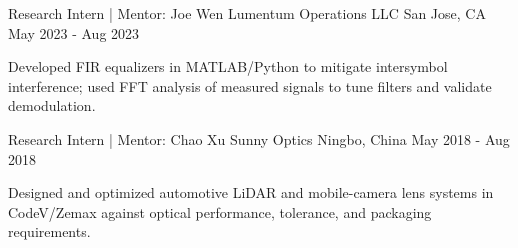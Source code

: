 
\begin{cventries}

  \cventry
    {Research Intern | Mentor: Joe Wen}
    {Lumentum Operations LLC}
    {San Jose, CA}
    {May 2023 - Aug 2023}
    {
      \begin{cvitems}
        \item {Developed FIR equalizers in MATLAB/Python to mitigate intersymbol interference; used FFT analysis of measured signals to tune filters and validate demodulation.}
      \end{cvitems}
    }

  \cventry
    {Research Intern | Mentor: Chao Xu}
    {Sunny Optics}
    {Ningbo, China}
    {May 2018 - Aug 2018}
    {
      \begin{cvitems}
        \item {Designed and optimized automotive LiDAR and mobile-camera lens systems in CodeV/Zemax against optical performance, tolerance, and packaging requirements.}
      \end{cvitems}
    }

\end{cventries}
